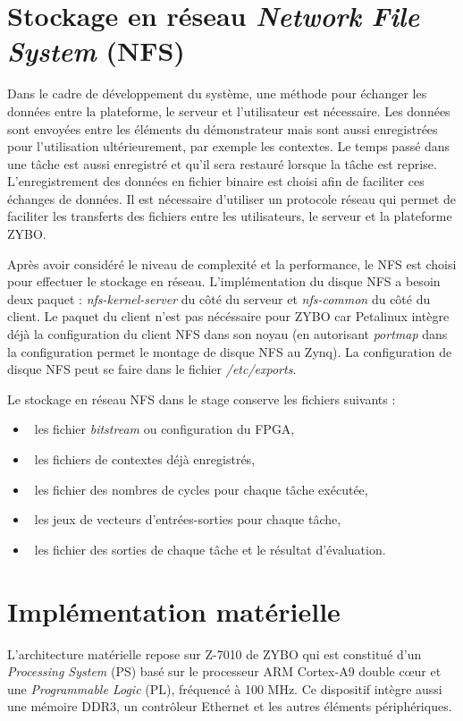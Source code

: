 \section{Stockage en réseau \emph{Network File System} (NFS)}
\label{sec:nfs}
Dans le cadre de développement du système, une méthode pour échanger les données 
entre la plateforme, le serveur et l'utilisateur est nécessaire.
Les données sont envoyées entre les éléments du démonstrateur mais sont aussi enregistrées pour l'utilisation ultérieurement,
par exemple les contextes. Le temps passé dans une tâche est aussi enregistré et qu'il sera restauré lorsque la tâche est reprise.
L'enregistrement des données en fichier binaire est choisi afin de faciliter ces échanges de données.
Il est nécessaire d'utiliser un protocole réseau qui permet de faciliter les transferts des fichiers entre les utilisateurs,
le serveur et la plateforme ZYBO.

Après  avoir considéré le niveau de complexité et la performance, le NFS
est choisi pour effectuer le stockage en réseau.
L'implémentation du disque NFS a besoin deux paquet : \emph{nfs-kernel-server} du côté du serveur et \emph{nfs-common} du côté du client.
Le paquet du client n'est pas nécéssaire pour ZYBO car Petalinux intègre déjà la configuration du client NFS 
dans son noyau (en autorisant \emph{portmap} dans la configuration permet le montage de disque NFS au Zynq). 
La configuration de disque NFS peut se faire dans le fichier \emph{/etc/exports}.

Le stockage en réseau NFS dans le stage conserve les fichiers suivants :
\begin{itemize}
	\item\ les fichier \emph{bitstream} ou configuration du FPGA,
	\item\ les fichiers de contextes déjà enregistrés,
	\item\ les fichier des nombres de cycles pour chaque tâche exécutée,
	\item\ les jeux de vecteurs d'entrées-sorties pour chaque tâche,
	\item\ les fichier des sorties de chaque tâche et le résultat d'évaluation.
\end{itemize}

\section{Implémentation matérielle}
\label{sec:materiel}
L'architecture matérielle repose sur Z-7010 de ZYBO qui est constitué d'un \emph{Processing System} (PS) 
basé sur le processeur ARM Cortex-A9 double cœur et une \emph{Programmable Logic} (PL), 
fréquencé à 100 MHz. Ce dispositif intègre aussi une mémoire DDR3,
un contrôleur Ethernet et les autres éléments périphériques. 

